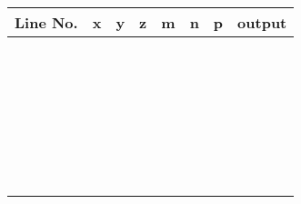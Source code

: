 \documentclass[12pt]{article}
\begin{document}
\begin{tabular}{|c|c|c|c|c|c|c|p{5cm}|}
   \hline
   Line No. & x & y & z & m & n & p & output\\\hline
   \hspace{1cm} & \hspace{1cm} & \hspace{1cm} & \hspace{1cm} & \hspace{1cm} &
   \hspace{1cm} & \hspace{1cm} & \\\hline
   &&&&&&&\\\hline
   &&&&&&&\\\hline
   &&&&&&&\\\hline
   &&&&&&&\\\hline
   &&&&&&&\\\hline
   &&&&&&&\\\hline
   &&&&&&&\\\hline
   &&&&&&&\\\hline
   &&&&&&&\\\hline
   &&&&&&&\\\hline
   &&&&&&&\\\hline
   &&&&&&&\\\hline
   &&&&&&&\\\hline
   &&&&&&&\\\hline
   &&&&&&&\\\hline
   &&&&&&&\\\hline
   &&&&&&&\\\hline
   &&&&&&&\\\hline
   &&&&&&&\\\hline
   &&&&&&&\\\hline
   &&&&&&&\\\hline
   &&&&&&&\\\hline
   &&&&&&&\\\hline
   &&&&&&&\\\hline
   &&&&&&&\\\hline
   &&&&&&&\\\hline
   &&&&&&&\\\hline
   &&&&&&&\\\hline
\end{tabular}
\end{document}
